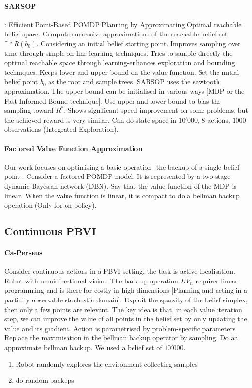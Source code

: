 \documentclass[review]{elsarticle}
\begin{document}
\paragraph{SARSOP}: Efficient Point-Based POMDP Planning by Approximating Optimal reachable belief space. Compute successive approximations
of the reachable belief set $\mathcal^*{R}(b_0)$. Considering an initial belief starting point. Improves sampling over time through 
simple on-line learning techniques. Tries to sample directly the optimal reachable space through learning-enhances exploration and bounding 
techniques. Keeps lower and upper bound on the value function. Set the initial belief point $b_0$ as the root and sample trees. SARSOP
uses the sawtooth approximation. The upper bound can be initialised in various ways [MDP or the Fast Informed Bound technique].
Use upper and lower bound to bias the sampling toward $R^*$. Shows significant speed improvement on some problems, but the achieved reward
is very similar. Can do state space in $10'000$, $8$ actions, $1000$ observations (Integrated Exploration).

\paragraph{Factored Value Function Approximation}
Our work focuses on optimising a basic operation -the backup of a single belief point-. Consider a factored POMDP model.
It is represented by a two-stage dynamic Bayesian network (DBN). Say that the value function of the MDP is linear. When 
the value function is linear, it is compact to do a bellman backup operation (Only for on policy).


\subsection{Continuous PBVI}

\paragraph{Ca-Perseus} 

\cite{Spaan05icra} %
Consider continuous actions in a PBVI setting, the task is active localisation. Robot with omnidirectional vision.
The back up operation $HV_n$ requires linear programming and is there for costly in high dimensions [Planning and acting in a 
partially observable stochastic domain]. Exploit the sparsity of the belief simplex, then only a few points are relevant.
The key idea is that, in each value iteration step, we can improve the value of all points in the belief set by only updating
the value and its gradient. Action is parametrised by problem-specific parameters.  
Replace the maximisation in the bellman backup operator by sampling. Do an approximate bellman backup. We used a belief set of 
$10'000$.
\begin{enumerate}
 \item Robot randomly explores the environment collecting samples
 \item do random backups 
\end{enumerate}
\end{document}
